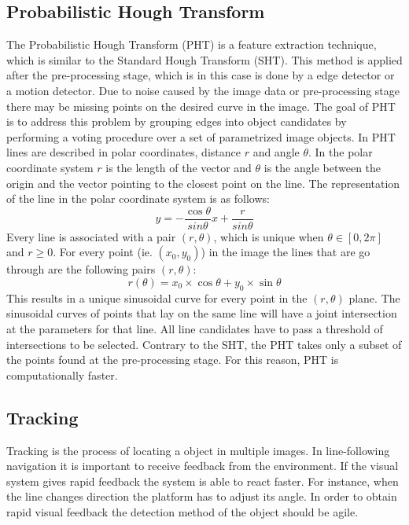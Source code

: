 \documentclass[a4paper]{article}
\begin{document}
\subsection{Probabilistic Hough Transform}
The Probabilistic Hough Transform (PHT) \cite{Kiryati1991} is a feature extraction technique, which is similar to the Standard Hough Transform (SHT). This method is applied after the pre-processing stage, which is in this case is done by a edge detector or a motion detector. Due to noise caused by the image data or pre-processing stage there may be missing points on the desired curve in the image. The goal of PHT is to address this problem by grouping edges into object candidates by performing a voting procedure over a set of parametrized image objects. In PHT lines are described in polar coordinates, distance $r$ and angle $\theta$. In the polar coordinate system $r$ is the length of the vector and $\theta$ is the angle between the origin and the vector pointing to the closest point on the line. The representation of the line in the polar coordinate system is as follows:
\begin{equation}
y = -\frac{\cos \theta}{sin \theta} x + \frac{r}{sin \theta}
\end{equation}
Every line is associated with a pair $(r,\theta)$, which is unique when $\theta \in [0, 2\pi]$ and $r \geq 0$. For every point (ie. $(x_0, y_0)$) in the image the lines that are go through are the following pairs $(r, \theta)$:
\begin{equation}
r(\theta) = x_0 \times \cos \theta + y_0 \times \sin \theta
\end{equation}
This results in a unique sinusoidal curve for every point in the $(r, \theta)$ plane. The sinusoidal curves of points that lay on the same line will have a joint intersection at the parameters for that line. All line candidates have to pass a threshold of intersections to be selected. Contrary to the SHT, the PHT takes only a subset of the points found at the pre-processing stage. For this reason, PHT is computationally faster.

\subsection{Tracking}
Tracking is the process of locating a object in multiple images. In line-following navigation it is important to receive feedback from the environment. If the visual system gives rapid feedback the system is able to react faster. For instance, when the line changes direction the platform has to adjust its angle. In order to obtain rapid visual feedback the detection method of the object should be agile.
\end{document}
